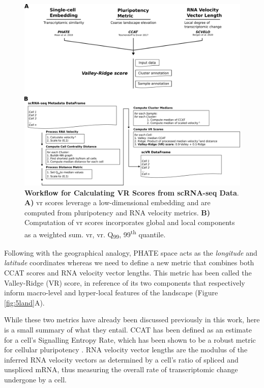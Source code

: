 \begin{figure}
    \centering
    \includegraphics{05vr/figs/5VR_score.png}
    \caption{\textbf{Workflow for Calculating VR Scores from scRNA-seq Data}. \textbf{A)} \acrshort{vr} scores leverage a low-dimensional embedding and are computed from pluripotency and RNA velocity metrics. \textbf{B)} Computation of \acrshort{vr} scores incorporates  global and local components as a weighted sum. \acrshort{vr}, \acrlong{vr}. Q\textsubscript{99}, 99\textsuperscript{th} quantile.}
    \label{fig:5score}
\end{figure}

Following with the geographical analogy, PHATE space acts as the \emph{longitude} and \emph{latitude} coordinates whereas we need to define a new metric that combines both CCAT scores and RNA velocity vector lengths. This metric has been called the Valley-Ridge (VR) score, in reference of its two components that respectively inform macro-level and hyper-local features of the landscape (Figure \ref{fig:5land}A).

While these two metrics have already been discussed previously in this work, here is a small summary of what they entail. CCAT has been defined as an estimate for a cell's Signalling Entropy Rate, which has been shown to be a robust metric for cellular pluripotency \cite{teschendorff_single-cell_2017,chen_single-cell_2019,senra_origins_2022}. RNA velocity vector lengths are the modulus of the inferred RNA velocity vectors as determined by a cell's ratio of spliced and unspliced mRNA, thus measuring the overall rate of transcriptomic change undergone by a cell.

